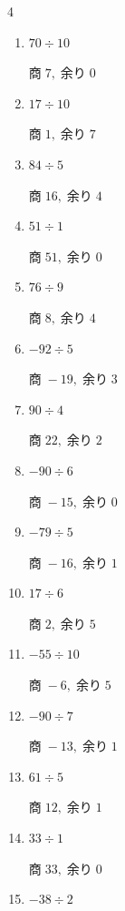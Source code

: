 \begin{multicols}{4}
\begin{enumerate}
        $商\; -3,\; 余り\; 1$

  \item $70 \div 10$

        $商\; 7,\; 余り\; 0$

  \item $17 \div 10$

        $商\; 1,\; 余り\; 7$

  \item $84 \div 5$

        $商\; 16,\; 余り\; 4$

  \item $51 \div 1$

        $商\; 51,\; 余り\; 0$

  \item $76 \div 9$

        $商\; 8,\; 余り\; 4$

  \item $-92 \div 5$

        $商\; -19,\; 余り\; 3$

  \item $90 \div 4$

        $商\; 22,\; 余り\; 2$

  \item $-90 \div 6$

        $商\; -15,\; 余り\; 0$

  \item $-79 \div 5$

        $商\; -16,\; 余り\; 1$

  \item $17 \div 6$

        $商\; 2,\; 余り\; 5$

  \item $-55 \div 10$

        $商\; -6,\; 余り\; 5$

  \item $-90 \div 7$

        $商\; -13,\; 余り\; 1$

  \item $61 \div 5$

        $商\; 12,\; 余り\; 1$

\columnbreak %

\resetques

  \item $33 \div 1$

        $商\; 33,\; 余り\; 0$

  \item $-38 \div 2$


\end{enumerate}
\end{multicols}
